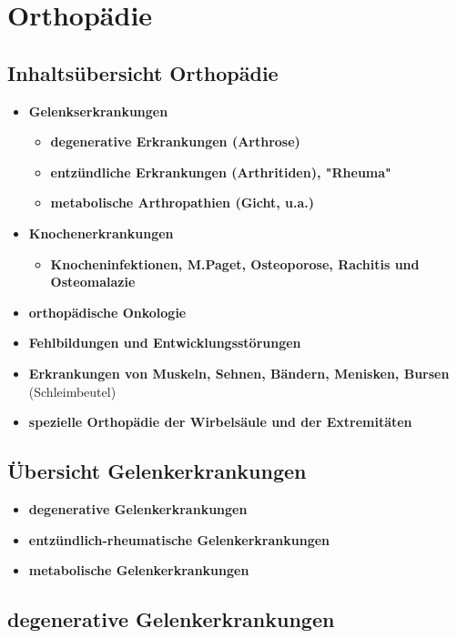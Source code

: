 \section{Orthopädie}
\subsection{Inhaltsübersicht Orthopädie}
	\begin{itemize}
		\item \textbf{Gelenkserkrankungen}
			\begin{itemize}
				\item \textbf{degenerative Erkrankungen (Arthrose)}
				\item \textbf{entzündliche Erkrankungen (Arthritiden), "Rheuma"}
				\item \textbf{metabolische Arthropathien (Gicht, u.a.)}
			\end{itemize}
		\item \textbf{Knochenerkrankungen}
			\begin{itemize}
				\item \textbf{Knocheninfektionen, M.Paget, Osteoporose, Rachitis und Osteomalazie}
			\end{itemize}
		\item \textbf{orthopädische Onkologie}
		\item \textbf{Fehlbildungen und Entwicklungsstörungen}
		\item \textbf{Erkrankungen von Muskeln, Sehnen, Bändern, Menisken, Bursen} (Schleimbeutel)
		\item \textbf{spezielle Orthopädie der Wirbelsäule und der Extremitäten}
 	\end{itemize}

\subsection{Übersicht Gelenkerkrankungen}
	\begin{itemize}
		\item \textbf{degenerative Gelenkerkrankungen}
		\item \textbf{entzündlich-rheumatische Gelenkerkrankungen}
		\item \textbf{metabolische Gelenkerkrankungen}
 	\end{itemize}
\subsection{degenerative Gelenkerkrankungen}
